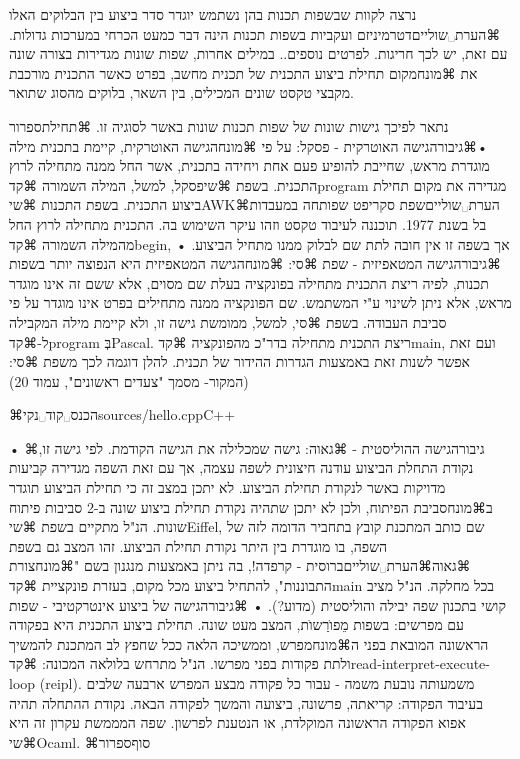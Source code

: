{נרצה לקוות שבשפות תכנות בהן נשתמש יוגדר סדר ביצוע בין הבלוקים האלו ⌘הערת␣שוליים{דטרמיניזם ועקביות בשפות תכנות הינה דבר כמעט הכרחי במערכות גדולות. עם זאת, יש לכך חריגות. לפרטים נוספים.}. במילים אחרות, שפות שונות מגדירות בצורה שונה את ⌘מונח{מקום תחילת ביצוע התכנית} של תכנית מחשב, בפרט כאשר התכנית מורכבת מקבצי טקסט שונים המכילים, בין השאר, בלוקים מהסוג שתואר. 

נתאר לפיכך גישות שונות של שפות תכנות שונות באשר לסוגיה זו.
⌘תחילת{ספרור}
•⌘גיבור{הגישה האוטרקית - פסקל:} על פי ⌘מונח{הגישה האוטרקית}, קיימת בתכנית מילה מוגדרת מראש, שחייבת להופיע פעם אחת ויחידה בתכנית, אשר החל ממנה מתחילה לרוץ התכנית. בשפת ⌘שי{פסקל}, למשל, המילה השמורה ⌘קד{program} מגדירה את מקום תחילת ביצוע התכנית. בשפת התכנות ⌘שי{AWK}⌘הערת␣שוליים{שפת סקריפט שפותחה במעבדות בל בשנת 1977. תוכננה לעיבוד טקסט וזהו עיקר השימוש בה.} התכנית מתחילה לרוץ החל מהמילה השמורה ⌘קד{begin}, אך בשפה זו אין חובה לתת שם לבלוק ממנו מתחיל הביצוע.
• ⌘גיבור{הגישה המטאפיזית - שפת ⌘סי:} ⌘מונח{הגישה המטאפיזית} היא הנפוצה יותר בשפות תכנות, לפיה ריצת התכנית מתחילה בפונקציה בעלת שם מסוים, אלא ששם זה אינו מוגדר מראש, אלא ניתן לשינוי ע"י המשתמש. שם הפונקציה ממנה מתחילים 
בפרט אינו מוגדר על פי סביבת העבודה. בשפת ⌘סי, למשל, ממומשת גישה זו, ולא קיימת מילה המקבילה
ל-⌘קד{program} בְּPascal. ריצת התכנית מתחילה בדר"כ מהפונקציה ⌘קד{main}, ועם זאת אפשר לשנות זאת באמצעות
הגדרות ההידור של תכנית. להלן דוגמה לכך משפת ⌘סי: (המקור- מסמך "צעדים ראשונים", עמוד 20)

⌘הכנס␣קוד␣נקי{sources/hello.cpp}{C++}

• ⌘גיבור{הגישה ההוליסטית - ⌘גאוה:} גישה שמכלילה את הגישה הקודמת. לפי גישה זו, נקודת התחלת הביצוע עודנה חיצונית לשפה עצמה, אך עם זאת השפה מגדירה קביעות מדויקות באשר לנקודת תחילת הביצוע. לא יתכן במצב זה כי תחילת הביצוע תוגדר ב⌘מונח{סביבת הפיתוח}, ולכן לא יתכן שתהיה נקודת תחילת ביצוע שונה ב-2 סביבות פיתוח שונות. הנ"ל מתקיים בשפת ⌘שי{Eiffel}, שם כותב המתכנת קובץ בתחביר הדומה לזה של השפה, בו מוגדרת בין היתר נקודת תחילת הביצוע. זהו המצב גם בשפת ⌘גאוה⌘הערת␣שוליים{ברוסית - קרפדה!}, בה ניתן באמצעות מנגנון בשם "⌘מונח{צורת התבוננות}", להתחיל ביצוע מכל מקום, בעזרת פונקציית ⌘קד{main} בכל מחלקה. הנ"ל מציב קושי בתכנון שפה יבילה והוליסטית (מדוע?).
• ⌘גיבור{הגישה של ביצוע אינטרקטיבי - שפות עם מפרשים:} בשפות מֵפוׂרַשוׂת, המצב מעט שונה. תחילת ביצוע התכנית היא בפקודה הראשונה המובאת בפני ה⌘מונח{מפרש}, וממשיכה הלאה ככל שחפץ לב המתכנת להמשיך ולתת פקודות בפני מפרשו. הנ"ל מתרחש בלולאה המכונה: ⌘קד{read-interpret-execute-loop (reipl)}. משמעותה נובעת משמה - עבור כל פקודה מבצע המפרש ארבעה שלבים בעיבוד הפקודה: קריאתה, פרשונה, ביצועה והמשך לפקודה הבאה. נקודת ההתחלה תהיה אפוא הפקודה הראשונה המוקלדת, או הנטענת לפרשון. שפה המממשת עקרון זה היא  ⌘שי{Ocaml}.
⌘סוף{ספרור}

}
